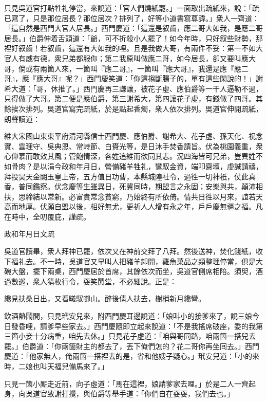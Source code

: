 只見吳道官打點牲礼停當，來說道：「官人們燒紙罷。」一面取出疏紙來，說：「疏已寫了，只是那位居長？那位居次？排列了，好等小道書寫尊諱。」衆人一齊道：「這自然是西門大官人居長。」{}西門慶道：「這還是叙齒，應二哥大如我，是應二哥居長。」伯爵伸着舌頭道：「爺，可不折殺小人罷了！{}如今年時，只好叙些財勢，那裡好叙齒！{}若叙齒，這還有大如我的哩。且是我做大哥，有兩件不妥：第一不如大官人有威有德，{}衆兄弟都服你；第二我原叫做應二哥，如今居長，卻又要叫應大哥，倘或有兩箇人來，一箇叫『應二哥』，一箇叫『應大哥』，我還是應『應二哥』，應『應大哥』呢？」西門慶笑道：「你這搊斷腸子的，單有這些閑說的！」謝希大道：「哥，休推了。」西門慶再三謙讓，被花子虛、應伯爵等一干人逼勒不過，只得做了大哥。第二便是應伯爵，第三謝希大，第四讓花子虛，有錢做了四哥。其餘挨次排列。吳道官寫完疏紙，於是點起香燭，衆人依次排列。吳道官伸開疏紙，朗聲讀道：

維大宋國山東東平府清河縣信士西門慶、應伯爵、謝希大、花子虛、孫天化、祝念實、雲理守、吳典恩、常峙節、白賚光等，是日沐手焚香請旨。伏為桃園義重，衆心仰慕而敢效其風；管鮑情深，各姓追維而欲同其志。況四海皆可兄弟，豈異姓不如骨肉？是以涓今政和年月日，營備豬羊牲礼，鸞馭金資，端叩齋壇，虔誠請禱，拜投昊天金闕玉皇上帝，五方值日功曹，本縣城隍社令，過徃一切神衹，仗此真香，普同鑑察。伏念慶等生雖異日，死冀同時，期盟言之永固；安樂與共，顛沛相扶，思締結以常新。必富貴常念貧窮，乃始終有所依倚。情共日徃以月來，誼若天高而地厚。伏願自盟以後，相好無尤，更祈人人增有永之年，戶戶慶無疆之福。凡在時中，全叨覆庇，謹疏。

政和年月日文疏

吳道官讀畢，衆人拜神已罷，依次又在神前交拜了八拜。然後送神，焚化錢紙，收下福礼去。不一時，吳道官又早叫人把豬羊卸開，雞魚菓品之類整理停當，俱是大碗大盤，擺下兩桌，西門慶居於首席，其餘依次而坐，吳道官側席相陪。須臾，酒過數巡，衆人猜枚行令，耍笑鬨堂，不必細說。正是：

纔見扶桑日出，又看曦馭啣山。醉後倩人扶去，樹梢新月纔彎。

飲酒熱鬧間，只見玳安兒來，附西門慶耳邊說道：「娘叫小的接爹來了，說三娘今日發昏哩，請爹早些家去。」西門慶隨即立起來說道：「不是我搖席破座，委的我第三箇小妾十分病重，咱先去休。」只見花子虛道：「咱與哥同路，咱兩箇一搭兒去罷。」伯爵道：「你兩箇財主的都去了，{}丟下俺們怎的？花二哥你再坐囘去。」西門慶道：「他家無人，俺兩箇一搭裡去的是，省和他嫂子疑心。」玳安兒道：「小的來時，二娘也叫天福兒備馬來了。」

只見一箇小厮走近前，向子虛道：「馬在這裡，娘請爹家去哩。」於是二人一齊起身，向吳道官致謝打攪，與伯爵等舉手道：「你們自在耍耍，我們去也。」

